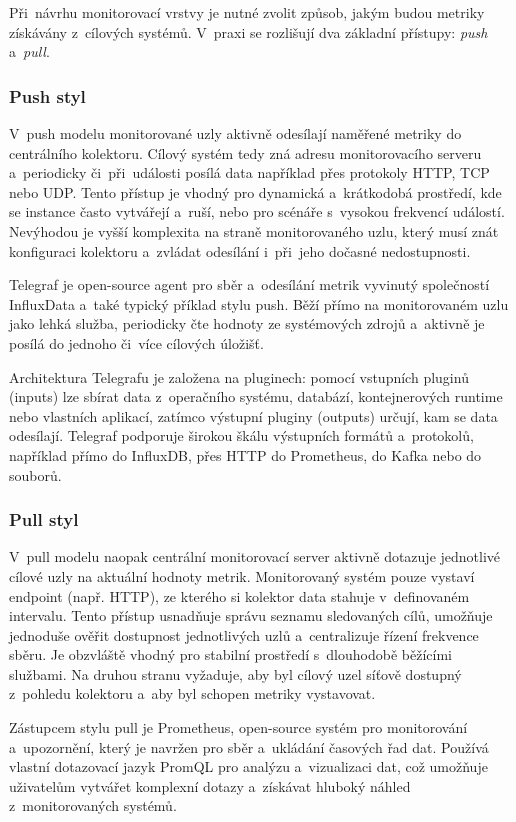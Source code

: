 Při~návrhu monitorovací vrstvy je nutné zvolit způsob, jakým budou metriky získávány z~cílových systémů. 
V~praxi se rozlišují dva základní přístupy: \textit{push} a~\textit{pull}.

\subsubsection{Push styl}
V~push modelu monitorované uzly aktivně odesílají naměřené metriky do centrálního kolektoru. 
Cílový systém tedy zná adresu monitorovacího serveru a~periodicky či~při~události posílá data například přes protokoly HTTP, TCP nebo UDP. 
Tento přístup je vhodný pro dynamická a~krátkodobá prostředí, kde se instance často vytvářejí a~ruší, nebo pro scénáře s~vysokou frekvencí událostí. 
Nevýhodou je vyšší komplexita na straně monitorovaného uzlu, který musí znát konfiguraci kolektoru a~zvládat odesílání i~při~jeho dočasné nedostupnosti.

Telegraf je open-source agent pro sběr a~odesílání metrik vyvinutý společností InfluxData a~také typický příklad stylu push. 
Běží přímo na monitorovaném uzlu jako lehká služba, periodicky čte hodnoty ze systémových zdrojů a~aktivně je posílá do jednoho či~více cílových úložišť. 

Architektura Telegrafu je založena na pluginech: pomocí vstupních pluginů (inputs) lze sbírat data z~operačního systému, databází, kontejnerových runtime nebo vlastních aplikací, zatímco výstupní pluginy (outputs) určují, kam se data odesílají.
Telegraf podporuje širokou škálu výstupních formátů a~protokolů, například přímo do InfluxDB, přes HTTP do Prometheus, do Kafka nebo do souborů. 
\cite{telegrafdocs}

\subsubsection{Pull styl}
V~pull modelu naopak centrální monitorovací server aktivně dotazuje jednotlivé cílové uzly na aktuální hodnoty metrik. 
Monitorovaný systém pouze vystaví endpoint (např. HTTP), ze kterého si kolektor data stahuje v~definovaném intervalu. 
Tento přístup usnadňuje správu seznamu sledovaných cílů, umožňuje jednoduše ověřit dostupnost jednotlivých uzlů a~centralizuje řízení frekvence sběru. 
Je obzvláště vhodný pro stabilní prostředí s~dlouhodobě běžícími službami. 
Na druhou stranu vyžaduje, aby byl cílový uzel síťově dostupný z~pohledu kolektoru a~aby byl schopen metriky vystavovat.

Zástupcem stylu pull je Prometheus, open-source systém pro monitorování a~upozornění, který je navržen pro sběr a~ukládání časových řad dat.
Používá vlastní dotazovací jazyk PromQL pro analýzu a~vizualizaci dat, což umožňuje uživatelům vytvářet komplexní dotazy a~získávat hluboký náhled z~monitorovaných systémů. \cite{prometheusdocs}


